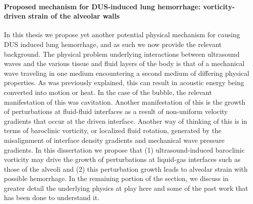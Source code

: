 \paragraph{Proposed mechanism for \ac{DUS}-induced lung hemorrhage: vorticity-driven strain of the alveolar walls}
In this thesis we propose yet another potential physical mechanism for
causing \ac{DUS} induced lung hemorrhage, and as such we now provide
the relevant background. The physical problem underlying interactions
between ultrasound waves and the various tissue and fluid layers of
the body is that of a mechanical wave traveling in one medium
encountering a second medium of differing physical properties. As was
previously explained, this can result in acoustic energy being
converted into motion or heat. In the case of the bubble, the relevant
manifestation of this was cavitation. Another manifestation of this is
the growth of perturbations at fluid-fluid interfaces as a result of
non-uniform velocity gradients that occur at the driven
interface. Another way of thinking of this is in terms of baroclinic
vorticity, or localized fluid rotation, generated by the misalignment
of interface density gradients and mechanical wave pressure
gradients. In this dissertation we propose that (1) ultrasound-induced
baroclinic vorticity may drive the growth of perturbations at liquid-gas
interfaces such as those of the alveoli and (2) this perturbation
growth leads to alveolar strain with possible hemorrhage. In the
remaining portion of the section, we discuss in greater detail the
underlying physics at play here and some of the past work that has
been done to understand it.

